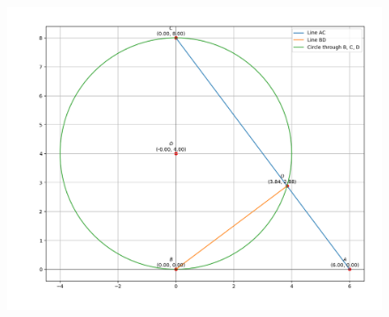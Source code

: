 \documentclass[journal]{IEEEtran}
\begin{document}
\begin{figure}[h!]
   \centering
   \includegraphics[width=\linewidth]{figs/figure_1.png}
   \label{stemplot}
   \caption{}
\end{figure}
\end{document}
